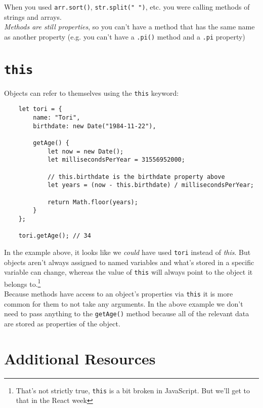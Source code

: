 When you used \texttt{arr.sort()}, \texttt{str.split(" ")}, etc. you were calling methods of strings and arrays.
\\

\textit{Methods are still properties}, so you can't have a method that has the same name as another property (e.g. you can't have a \texttt{.pi()} method and a \texttt{.pi} property)


\section{\texttt{this}}

Objects can refer to themselves using the \texttt{this} keyword:

\begin{verbatim}
    let tori = {
        name: "Tori",
        birthdate: new Date("1984-11-22"),

        getAge() {
            let now = new Date();
            let millisecondsPerYear = 31556952000;

            // this.birthdate is the birthdate property above
            let years = (now - this.birthdate) / millisecondsPerYear;

            return Math.floor(years);
        }
    };

    tori.getAge(); // 34
\end{verbatim}

In the example above, it looks like we \textit{could} have used \texttt{tori} instead of \textit{this}. But objects aren't always assigned to named variables and what's stored in a specific variable can change, whereas the value of \texttt{this} will always point to the object it belongs to.\footnote{That's not strictly true, \texttt{this} is a bit broken in JavaScript. But we'll get to that in the React week}
\\

Because methods have access to an object's properties via \texttt{this} it is more common for them to not take any arguments. In the above example we don't need to pass anything to the \texttt{getAge()} method because all of the relevant data are stored as properties of the object.

\pagebreak

\section{Additional Resources}

